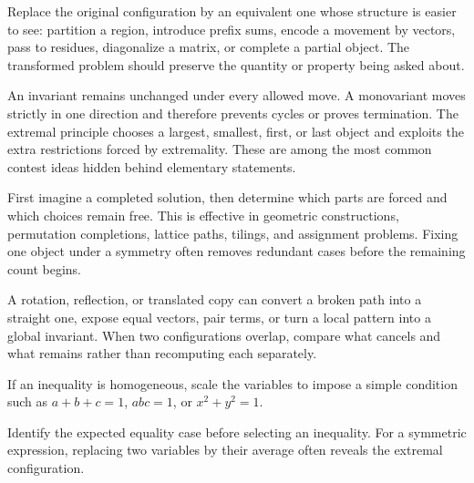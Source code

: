     \begin{strategy}
        Replace the original configuration by an equivalent one whose structure
        is easier to see: partition a region, introduce prefix sums, encode a
        movement by vectors, pass to residues, diagonalize a matrix, or complete
        a partial object. The transformed problem should preserve the quantity or
        property being asked about.
    \end{strategy}

    \begin{strategy}
        An invariant remains unchanged under every allowed move. A monovariant
        moves strictly in one direction and therefore prevents cycles or proves
        termination. The extremal principle chooses a largest, smallest, first,
        or last object and exploits the extra restrictions forced by extremality.
        These are among the most common contest ideas hidden behind elementary
        statements.
    \end{strategy}

    \begin{strategy}
        First imagine a completed solution, then determine which parts are forced
        and which choices remain free. This is effective in geometric
        constructions, permutation completions, lattice paths, tilings, and
        assignment problems. Fixing one object under a symmetry often removes
        redundant cases before the remaining count begins.
    \end{strategy}

    \begin{strategy}
        A rotation, reflection, or translated copy can convert a broken path into
        a straight one, expose equal vectors, pair terms, or turn a local pattern
        into a global invariant. When two configurations overlap, compare what
        cancels and what remains rather than recomputing each separately.
    \end{strategy}

    \begin{strategy}
        If an inequality is homogeneous, scale the variables to impose a simple
        condition such as $a+b+c=1$, $abc=1$, or $x^2+y^2=1$.
    \end{strategy}

    \begin{strategy}
        Identify the expected equality case before selecting an inequality.
        For a symmetric expression, replacing two variables by their average
        often reveals the extremal configuration.
    \end{strategy}


